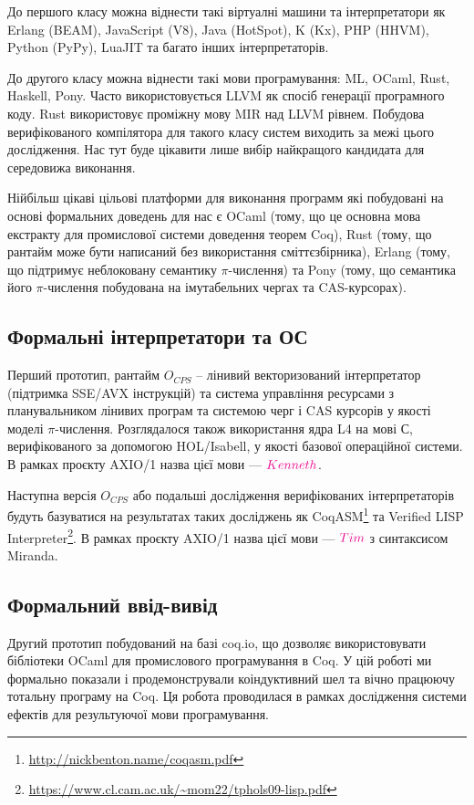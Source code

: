 До першого класу можна віднести такі віртуалні машини та інтерпретатори як
Erlang (BEAM), JavaScript (V8), Java (HotSpot), K (Kx), PHP (HHVM), Python (PyPy), LuaJIT
та багато інших інтерпретаторів.

До другого класу можна віднести такі мови програмування: ML, OCaml, Rust,
Haskell, Pony. Часто використовується LLVM як спосіб генерації програмного коду.
Rust використовує проміжну мову MIR над LLVM рівнем. Побудова верифікованого компілятора
для такого класу систем виходить за межі цього дослідження. Нас тут буде цікавити
лише вибір найкращого кандидата для середовижа виконання.

Нійбільш цікаві цільові платформи для виконання программ
які побудовані на основі формальних доведень для нас є OCaml (тому,
що це основна мова екстракту для промислової системи доведення теорем Coq),
Rust (тому, що рантайм може бути написаний без використання сміттєзбірника),
Erlang (тому, що підтримує неблоковану семантику $\pi$-числення)
та Pony (тому, що семантика його $\pi$-числення побудована на
імутабельних чергах та CAS-курсорах).

\subsection{Формальні інтерпретатори та ОС}
Перший прототип, рантайм $O_{CPS}$ -- лінивий
векторизований інтерпретатор (підтримка SSE/AVX інструкцій) та система
управління ресурсами з планувальником лінивих програм
та системою черг і CAS курсорів у якості моделі $\pi$-числення. Розглядалося також
використання ядра L4 на мові С, верифікованого за допомогою HOL/Isabell,
у якості базової операційної системи. В рамках проєкту AXIO/1
назва цієї мови --- $\textcolor{magenta}{Kenneth}$.

Наступна версія $O_{CPS}$ або подальші дослідження верифікованих інтерпретаторів
будуть базуватися на результатах таких досліджень як
CoqASM\footnote{\url{http://nickbenton.name/coqasm.pdf}} та
Verified LISP Interpreter\footnote{\url{https://www.cl.cam.ac.uk/~mom22/tphols09-lisp.pdf}}.
В рамках проєкту AXIO/1 назва цієї мови --- $\textcolor{magenta}{Tim}$ з синтаксисом Miranda.

\subsection{Формальний ввід-вивід}
Другий прототип побудований на базі coq.io, що дозволяє
використовувати бібліотеки OCaml для промислового програмування в Coq.
У цій роботі ми формально показали і продемонстрували коіндуктивний шел
та вічно працюючу тотальну програму на Coq. Ця робота проводилася
в рамках дослідження системи ефектів для результуючої мови програмування.

